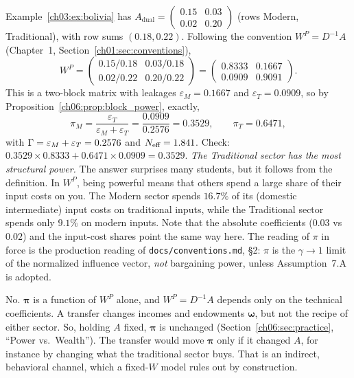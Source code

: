 \documentclass[../solutions_manual.tex]{subfiles}
\begin{document}
 Example~\ref{ch03:ex:bolivia} has $A_{\text{dual}} = \begin{pmatrix}0.15 & 0.03\\0.02 & 0.20\end{pmatrix}$ (rows Modern, Traditional), with row sums $(0.18, 0.22)$. Following the convention $W^P = D^{-1}A$ (Chapter~1, Section~\ref{ch01:sec:conventions}),
\[
W^P = \begin{pmatrix} 0.15/0.18 & 0.03/0.18 \\ 0.02/0.22 & 0.20/0.22\end{pmatrix} = \begin{pmatrix} 0.8333 & 0.1667 \\ 0.0909 & 0.9091\end{pmatrix}.
\]
This is a two-block matrix with leakages $\varepsilon_M = 0.1667$ and $\varepsilon_T = 0.0909$, so by Proposition~\ref{ch06:prop:block_power}, exactly,
\[
\pi_M = \frac{\varepsilon_T}{\varepsilon_M + \varepsilon_T} = \frac{0.0909}{0.2576} = 0.3529, \qquad \pi_T = 0.6471,
\]
with $\Gamma = \varepsilon_M + \varepsilon_T = 0.2576$ and $N_{\text{eff}} = 1.841$.
Check: $0.3529 \times 0.8333 + 0.6471 \times 0.0909 = 0.3529$. \emph{The Traditional sector has the most structural power.} The answer surprises many students, but it follows from the definition. In $W^P$, being powerful means that others spend a large share of their input costs on you. The Modern sector spends $16.7\%$ of its (domestic intermediate) input costs on traditional inputs, while the Traditional sector spends only $9.1\%$ on modern inputs. Note that the absolute coefficients ($0.03$ vs $0.02$) and the input-cost shares point the same way here. The reading of $\pi$ in force is the production reading of \nolinkurl{docs/conventions.md}, \S2: $\pi$ is the $\gamma \to 1$ limit of the normalized influence vector, \emph{not} bargaining power, unless Assumption~7.A is adopted.

 No. $\boldsymbol{\pi}$ is a function of $W^P$ alone, and $W^P = D^{-1}A$ depends only on the technical coefficients. A transfer changes incomes and endowments $\boldsymbol{\omega}$, but not the recipe of either sector. So, holding $A$ fixed, $\boldsymbol{\pi}$ is unchanged (Section~\ref{ch06:sec:practice}, ``Power vs.\ Wealth''). The transfer would move $\boldsymbol{\pi}$ only if it changed $A$, for instance by changing what the traditional sector buys. That is an indirect, behavioral channel, which a fixed-$W$ model rules out by construction.
\end{document}
